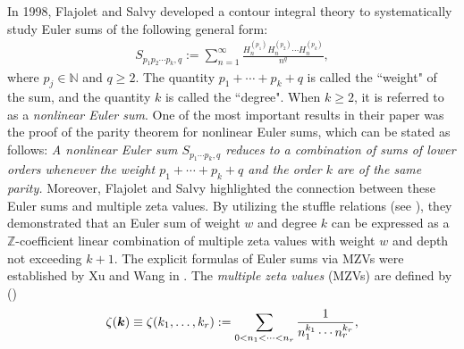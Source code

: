 \documentclass[11pt]{article}
\newcommand{\bfk}{{\boldsymbol{\sl{k}}}}
\def\N{\mathbb{N}}
\def\Z{\mathbb{Z}}
\theoremstyle{plain}
\theoremstyle{definition}
\begin{document}
In 1998, Flajolet and Salvy developed a contour integral theory to systematically study Euler sums of the following general form:
\begin{align}
{S_{{p_1p_2\cdots p_k},q}} := \sum\limits_{n = 1}^\infty  {\frac{{H_n^{\left( {{p_1}} \right)}H_n^{\left( {{p_2}} \right)} \cdots H_n^{\left( {{p_k}} \right)}}}
{{{n^{q}}}}},
\end{align}
where $p_j\in \N$ and $q\geq 2$. The quantity $p_1+\cdots+p_k+q$ is called the ``weight" of the sum, and the quantity $k$ is called the
``degree". When $k\geq 2$, it is referred to as a \emph{nonlinear Euler sum}. One of the most important results in their paper was the proof of the parity theorem for nonlinear Euler sums, which can be stated as follows: \emph{A nonlinear Euler sum $S_{p_1\cdots p_k,q}$ reduces to a combination of sums of lower orders whenever the weight $p_1+\cdots+p_k+q$ and the order $k$ are of the same parity.} Moreover, Flajolet and Salvy highlighted the connection between these Euler sums and multiple zeta values. By utilizing the stuffle relations (see \cite{H2000}), they demonstrated that an Euler sum of weight $w$ and degree $k$ can be expressed as a $\Z$-coefficient linear combination of multiple zeta values with weight $w$ and depth not exceeding $k+1$.  The explicit formulas of Euler sums via MZVs were established by Xu and Wang in \cite{Xu-Wang2020}. The \emph{multiple zeta values} (MZVs) are defined by (\cite{H1992,DZ1994})
\begin{align}
\zeta(\bfk)\equiv \zeta(k_1,\ldots,k_r):=\sum_{0<n_1<\cdots<n_r} \frac{1}{n_1^{k_1}\cdots n_r^{k_r}},
\end{align}
\end{document}
